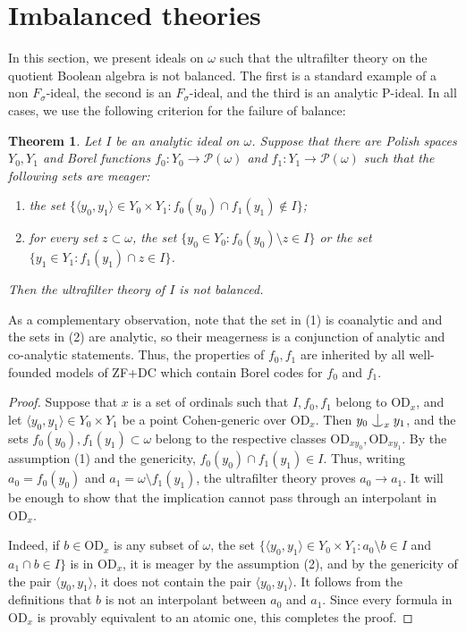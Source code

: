 \documentclass{article}
\newcommand{\gw}{\omega}
\newcommand{\gs}{\sigma}
\newcommand{\forkindep}[1][]{%
  \mathrel{
    \mathop{
      \vcenter{
        \hbox{\oalign{\noalign{\kern-.3ex}\hfil$\vert$\hfil\cr
              \noalign{\kern-.7ex}
              $\smile$\cr\noalign{\kern-.3ex}}}
      }
    }\displaylimits_{#1}
  }
}
\newcommand{\power}{\mathcal{P}}
\newcommand{\vd}{\mathrm{OD}}
\newtheorem{theorem}{Theorem}[section]
\theoremstyle{definition}
\begin{document}
\section{Imbalanced theories}
\label{imbalancedsection}

\noindent In this section, we present ideals on $\gw$ such that the ultrafilter theory on the quotient Boolean algebra is not balanced. The first is a standard example of a non $F_{\gs}$-ideal, the second is an $F_\sigma$-ideal, and the third is an analytic P-ideal. In all cases, we use the following criterion for the failure of balance:

\begin{theorem}
\label{imbalancetheorem}
Let $I$ be an analytic ideal on $\gw$. Suppose that there are Polish spaces $Y_0, Y_1$ and Borel functions $f_0\colon Y_0\to\power(\gw)$ and $f_1\colon Y_1\to\power(\gw)$ such that the following sets are meager:

\begin{enumerate}
\item the set $\{\langle y_0, y_1\rangle\in Y_0\times Y_1\colon f_0(y_0)\cap f_1(y_1)\notin I\}$;
\item for every set $z\subset\gw$, the set $\{y_0\in Y_0\colon f_0(y_0)\setminus z\in I\}$ or the set $\{y_1\in Y_1\colon f_1(y_1)\cap z\in I\}$.
\end{enumerate}

\noindent Then the ultrafilter theory of $I$ is not balanced.
\end{theorem}

\noindent As a complementary observation, note that the set in (1) is coanalytic and and the sets in (2) are analytic, so their meagerness is a conjunction of analytic and co-analytic statements. Thus, the properties of $f_0, f_1$ are inherited by all well-founded models of ZF+DC which contain Borel codes for $f_0$ and $f_1$.

\begin{proof}
Suppose that $x$ is a set of ordinals such that $I, f_0, f_1$ belong to $\vd_x$, and let $\langle y_0, y_1\rangle\in Y_0\times Y_1$ be a point Cohen-generic over $\vd_x$. Then $y_0\forkindep[x]y_1$, and the sets $f_0(y_0), f_1(y_1)\subset\gw$ belong to the respective classes $\vd_{xy_0}, \vd_{xy_1}$. By the assumption (1) and the genericity, $f_0(y_0)\cap f_1(y_1)\in I$. Thus, writing $a_0=f_0(y_0)$ and $a_1=\gw\setminus f_1(y_1)$, the ultrafilter theory proves $a_0\to a_1$. It will be enough to show that the implication cannot pass through an interpolant in $\vd_x$.

Indeed, if $b\in\vd_x$ is any subset of $\gw$, the set $\{\langle y_0, y_1\rangle\in Y_0\times Y_1\colon a_0\setminus b\in I$ and $a_1\cap b\in I\}$ is in $\vd_x$, it is meager by the assumption (2), and by the genericity of the pair $\langle y_0, y_1\rangle$, it does not contain the pair $\langle y_0, y_1\rangle$. It follows from the definitions that $b$ is not an interpolant between $a_0$ and $a_1$. Since every formula in $\vd_x$ is provably equivalent to an atomic one, this completes the proof.
\end{proof}
\end{document}
